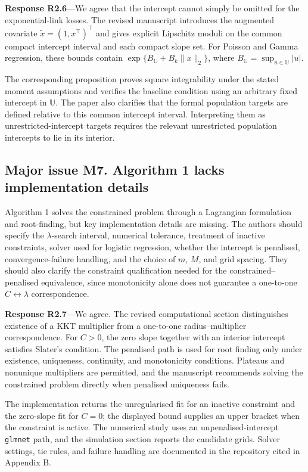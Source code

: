 \documentclass[11pt]{article}
\newcommand{\response}[1]{\par\noindent\textbf{Response #1}---}
\begin{document}
\response{R2.6}We agree that the intercept cannot simply be omitted for the exponential-link losses. The revised manuscript introduces the augmented covariate $\widetilde x=(1,x^\top)^\top$ and gives explicit Lipschitz moduli on the common compact intercept interval and each compact slope set. For Poisson and Gamma regression, these bounds contain $\exp\{B_{\mathbb U}+B_k\|x\|_2\}$, where $B_{\mathbb U}=\sup_{u\in\mathbb U}|u|$.

The corresponding proposition proves square integrability under the stated moment assumptions and verifies the baseline condition using an arbitrary fixed intercept in $\mathbb U$. The paper also clarifies that the formal population targets are defined relative to this common intercept interval. Interpreting them as unrestricted-intercept targets requires the relevant unrestricted population intercepts to lie in its interior.

\subsection*{Major issue M7. Algorithm 1 lacks implementation details}
Algorithm 1 solves the constrained problem through a Lagrangian formulation and root-finding, but key implementation details are missing. The authors should specify the $\lambda$-search interval, numerical tolerance, treatment of inactive constraints, solver used for logistic regression, whether the intercept is penalised, convergence-failure handling, and the choice of $m$, $M$, and grid spacing. They should also clarify the constraint qualification needed for the constrained--penalised equivalence, since monotonicity alone does not guarantee a one-to-one $C\leftrightarrow\lambda$ correspondence.

\response{R2.7}We agree. The revised computational section distinguishes existence of a KKT multiplier from a one-to-one radius--multiplier correspondence. For $C>0$, the zero slope together with an interior intercept satisfies Slater's condition. The penalised path is used for root finding only under existence, uniqueness, continuity, and monotonicity conditions. Plateaus and nonunique multipliers are permitted, and the manuscript recommends solving the constrained problem directly when penalised uniqueness fails.

The implementation returns the unregularised fit for an inactive constraint and the zero-slope fit for $C=0$; the displayed bound supplies an upper bracket when the constraint is active. The numerical study uses an unpenalised-intercept \texttt{glmnet} path, and the simulation section reports the candidate grids. Solver settings, tie rules, and failure handling are documented in the repository cited in Appendix B.
\end{document}
